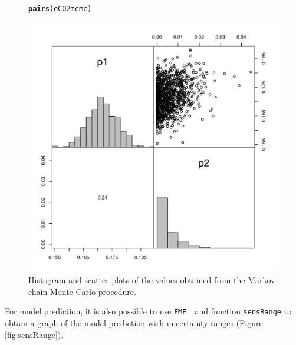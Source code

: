 \documentclass[a4paper]{article}\usepackage[]{graphicx}\usepackage[]{color}
\makeatletter
\def\maxwidth{ %
  \ifdim\Gin@nat@width>\linewidth
    \linewidth
  \else
    \Gin@nat@width
  \fi
}
\newcommand{\hlstd}[1]{\textcolor[rgb]{0.345,0.345,0.345}{#1}}%
\newcommand{\hlkwd}[1]{\textcolor[rgb]{0.737,0.353,0.396}{\textbf{#1}}}%
\newenvironment{kframe}{%
 \def\at@end@of@kframe{}%
 \ifinner\ifhmode%
  \def\at@end@of@kframe{\end{minipage}}%
  \begin{minipage}{\columnwidth}%
 \fi\fi%
 \def\FrameCommand##1{\hskip\@totalleftmargin \hskip-\fboxsep
 \colorbox{shadecolor}{##1}\hskip-\fboxsep
     \hskip-\linewidth \hskip-\@totalleftmargin \hskip\columnwidth}%
 \MakeFramed {\advance\hsize-\width
   \@totalleftmargin\z@ \linewidth\hsize
   \@setminipage}}%
 {\par\unskip\endMakeFramed%
 \at@end@of@kframe}
\newenvironment{knitrout}{}{} %
\newcommand{\FME}{\texttt{FME }}
\makeatother
\begin{document}
\begin{figure}
  \centering
\begin{knitrout}
\color{fgcolor}\begin{kframe}
\begin{alltt}
\hlkwd{pairs}\hlstd{(eCO2mcmc)}
\end{alltt}
\end{kframe}
\includegraphics[width=\maxwidth]{figure/unnamed-chunk-14-1} 

\end{knitrout}
  \caption{Histogram and scatter plots of the values obtained from the Markov chain Monte Carlo procedure.}
  \label{fig:mcmc}
\end{figure}

For model prediction, it is also possible to use \FME \, and function {\tt sensRange} to obtain a graph of the model prediction with uncertainty ranges (Figure \ref{fig:sensRange}).
\end{document}
